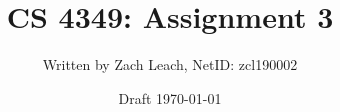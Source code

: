 

\title{\Huge CS 4349: Assignment 3}
\author{\Large Written by Zach Leach, NetID: zcl190002}
\date{\Large Draft \today \\[36pt]}


\maketitle


